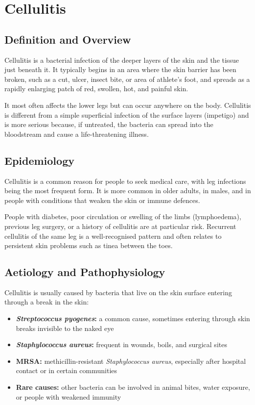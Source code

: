 \chapter{Cellulitis}

\section*{Definition and Overview}
Cellulitis is a bacterial infection of the deeper layers of the skin and the tissue just beneath it. It typically begins in an area where the skin barrier has been broken, such as a cut, ulcer, insect bite, or area of athlete's foot, and spreads as a rapidly enlarging patch of red, swollen, hot, and painful skin.

It most often affects the lower legs but can occur anywhere on the body. Cellulitis is different from a simple superficial infection of the surface layers (impetigo) and is more serious because, if untreated, the bacteria can spread into the bloodstream and cause a life-threatening illness.

\section*{Epidemiology}
Cellulitis is a common reason for people to seek medical care, with leg infections being the most frequent form. It is more common in older adults, in males, and in people with conditions that weaken the skin or immune defences.

People with diabetes, poor circulation or swelling of the limbs (lymphoedema), previous leg surgery, or a history of cellulitis are at particular risk. Recurrent cellulitis of the same leg is a well-recognised pattern and often relates to persistent skin problems such as tinea between the toes.

\section*{Aetiology and Pathophysiology}
Cellulitis is usually caused by bacteria that live on the skin surface entering through a break in the skin:

\begin{itemize}
    \item \textbf{\textit{Streptococcus pyogenes}:} a common cause, sometimes entering through skin breaks invisible to the naked eye
    \item \textbf{\textit{Staphylococcus aureus}:} frequent in wounds, boils, and surgical sites
    \item \textbf{MRSA:} methicillin-resistant \textit{Staphylococcus aureus}, especially after hospital contact or in certain communities
    \item \textbf{Rare causes:} other bacteria can be involved in animal bites, water exposure, or people with weakened immunity
\end{itemize}

